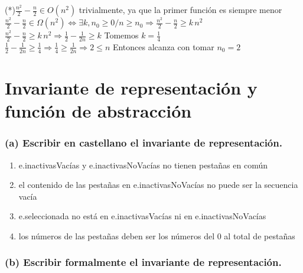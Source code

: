 \documentclass[10pt, a4paper]{article}
\begin{document}
(*)$\frac{n^2}{2} - \frac{n}{2} \in O(n^2)$ trivialmente, ya que la primer función es siempre menor\\
$\frac{n^2}{2} - \frac{n}{2} \in \Omega (n^2) \Leftrightarrow \exists k, n_0 \ge 0 / n\ge n_0 \Rightarrow \frac{n^2}{2} - \frac{n}{2} \ge k \, n^2$\\
$\frac{n^2}{2} - \frac{n}{2} \ge k \, n^2 \Rightarrow  \frac{1}{2} - \frac{1}{2n} \ge k$ Tomemos $k = \frac{1}{4}$\\
$\frac{1}{2} - \frac{1}{2n} \ge \frac{1}{4} \Rightarrow \frac{1}{4} \ge \frac{1}{2n} \Rightarrow 2 \le n$ Entonces alcanza con tomar $n_0 = 2$



\section{Invariante de representación y \\función de abstracción}
\subsubsection*{(a) Escribir en castellano el invariante de representación.}
\begin{enumerate}
\item e.inactivasVacías y e.inactivasNoVacías no tienen pestañas en común
\item el contenido de las pestañas en e.inactivasNoVacías no puede ser la secuencia vacía
\item e.seleccionada no está en e.inactivasVacías ni en e.inactivasNoVacías
\item los números de las pestañas deben ser los números del 0 al total de pestañas
\end{enumerate}

\newpage

\subsubsection*{(b) Escribir formalmente el invariante de representación.}
\end{document}
